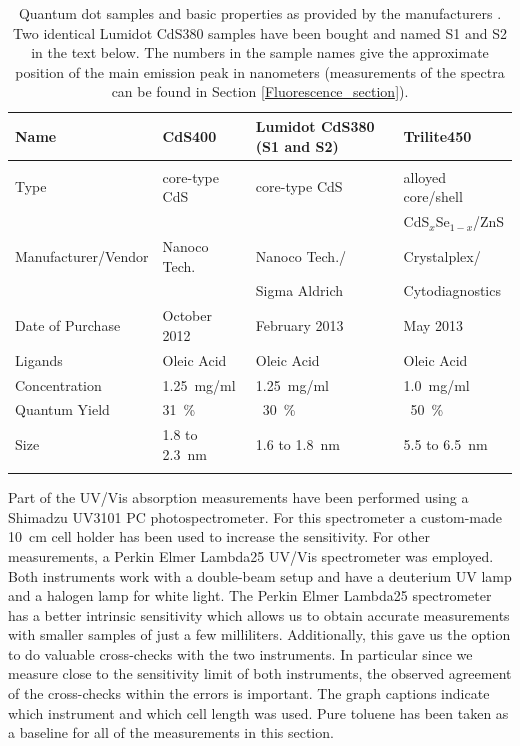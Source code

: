 \documentclass[cits]{JINST}
\begin{document}
\begin{table}[th]
\caption{Quantum dot samples and basic properties as provided by the manufacturers \cite{nanoco, sigma, cytodiagnostics, crystalplex}. Two identical Lumidot CdS380 samples have been bought and named S1 and S2 in the text below. The numbers in the sample names give the approximate position of the main emission peak in nanometers (measurements of the spectra can be found in Section \protect\ref{Fluorescence_section}).}
  \begin{center}
    \begin{tabular}{llll}
      Name & CdS400 & Lumidot CdS380 (S1 and S2)& Trilite450 \\
      \hline\hline\\[-5px]
      Type & core-type CdS & core-type CdS & alloyed core/shell \\ 
           &               &               & CdS$_x$Se$_{1-x}$/ZnS \\
      Manufacturer/Vendor & Nanoco Tech. & Nanoco Tech./ & Crystalplex/ \\
                          &              & Sigma Aldrich & Cytodiagnostics \\
      Date of Purchase & October 2012 & February 2013 & May 2013 \\
      Ligands & Oleic Acid & Oleic Acid & Oleic Acid \\
      Concentration & 1.25~mg/ml & 1.25~mg/ml & 1.0~mg/ml \\
      Quantum Yield & 31~\% & ~30~\%  & ~50~\% \\
      Size & 1.8 to 2.3~nm & 1.6 to 1.8~nm & 5.5 to 6.5~nm\\[5px] 
      \hline
    \label{samples_table}
    \end{tabular}
  \end{center}
\end{table}

Part of the UV/Vis absorption measurements have been performed using a Shimadzu UV3101 PC photospectrometer. For this spectrometer a custom-made 10~cm cell holder has been used to increase the sensitivity. For other measurements, a Perkin Elmer Lambda25 UV/Vis spectrometer was employed. Both instruments work with a double-beam setup and have a deuterium UV lamp and a halogen lamp for white light. The Perkin Elmer Lambda25 spectrometer has a better intrinsic sensitivity which allows us to obtain accurate measurements with smaller samples of just a few milliliters. Additionally, this gave us the option to do valuable cross-checks with the two instruments. In particular since we measure close to the sensitivity limit of both instruments, the observed agreement of the cross-checks within the errors is important. The graph captions indicate which instrument and which cell length was used. Pure toluene has been taken as a baseline for all of the measurements in this section. 
\end{document}
